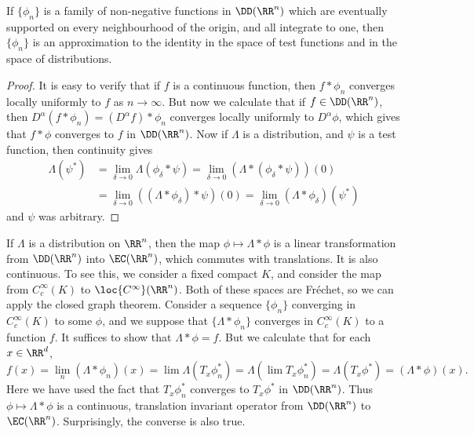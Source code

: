\begin{theorem}
    If $\{ \phi_n \}$ is a family of non-negative functions in $\DD(\RR^n)$ which are eventually supported on every neighbourhood of the origin, and all integrate to one, then $\{ \phi_n \}$ is an approximation to the identity in the space of test functions and in the space of distributions.
\end{theorem}
\begin{proof}
    It is easy to verify that if $f$ is a continuous function, then $f * \phi_n$ converges locally uniformly to $f$ as $n \to \infty$. But now we calculate that if $f \in \DD(\RR^n)$, then $D^\alpha(f * \phi_n) = (D^\alpha f) * \phi_n$ converges locally uniformly to $D^\alpha \phi$, which gives that $f * \phi$ converges to $f$ in $\DD(\RR^n)$. Now if $\Lambda$ is a distribution, and $\psi$ is a test function, then continuity gives
    \begin{align*}
        \Lambda(\psi^*) &= \lim_{\delta \to 0} \Lambda(\phi_\delta * \psi) = \lim_{\delta \to 0} (\Lambda * (\phi_\delta * \psi))(0)\\
        &= \lim_{\delta \to 0} ((\Lambda * \phi_\delta) * \psi)(0) = \lim_{\delta \to 0} (\Lambda * \phi_\delta)(\psi^*)
    \end{align*}
    and $\psi$ was arbitrary.
\end{proof}

If $\Lambda$ is a distribution on $\RR^n$, then the map $\phi \mapsto \Lambda * \phi$ is a linear transformation from $\DD(\RR^n)$ into $\EC(\RR^n)$, which commutes with translations. It is also continuous. To see this, we consider a fixed compact $K$, and consider the map from $C_c^\infty(K)$ to $\loc{C^\infty}(\RR^n)$. Both of these spaces are Fr\'{e}chet, so we can apply the closed graph theorem. Consider a sequence $\{ \phi_n \}$ converging in $C_c^\infty(K)$ to some $\phi$, and we suppose that $\{ \Lambda * \phi_n \}$ converges in $C_c^\infty(K)$ to a function $f$. It suffices to show that $\Lambda * \phi = f$. But we calculate that for each $x \in \RR^d$,
%
\[ f(x) = \lim_n (\Lambda * \phi_n)(x) = \lim \Lambda(T_x \phi^*_n) = \Lambda (\lim T_x \phi^*_n) = \Lambda(T_x \phi^*) = (\Lambda * \phi)(x). \]
%
Here we have used the fact that $T_x \phi_n^*$ converges to $T_x \phi^*$ in $\DD(\RR^n)$. Thus $\phi \mapsto \Lambda * \phi$ is a continuous, translation invariant operator from $\DD(\RR^n)$ to $\EC(\RR^n)$. Surprisingly, the converse is also true.

